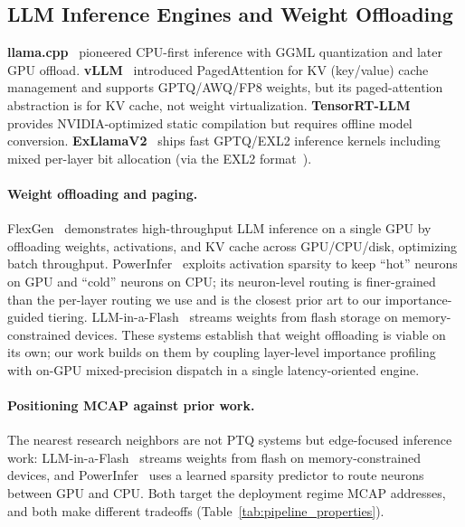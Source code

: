 \documentclass{article}
\begin{document}
\subsection{LLM Inference Engines and Weight Offloading}

\textbf{llama.cpp}~\cite{ggerganov2023llamacpp} pioneered CPU-first inference with GGML
quantization and later GPU offload. \textbf{vLLM}~\cite{kwon2023efficient} introduced
PagedAttention for KV (key/value) cache management and supports GPTQ/AWQ/FP8 weights, but its
paged-attention abstraction is for KV cache, not weight virtualization.
\textbf{TensorRT-LLM}~\cite{nvidia2023tensorrt} provides NVIDIA-optimized static
compilation but requires offline model conversion. \textbf{ExLlamaV2}~\cite{turboderp2023exllama}
ships fast GPTQ/EXL2 inference kernels including mixed per-layer bit allocation (via the
EXL2 format~\cite{turboderp2024exl2}).

\paragraph{Weight offloading and paging.} FlexGen~\cite{sheng2023flexgen}
demonstrates high-throughput LLM inference on a single GPU by offloading
weights, activations, and KV cache across GPU/CPU/disk, optimizing batch
throughput. PowerInfer~\cite{song2024powerinfer} exploits activation
sparsity to keep ``hot'' neurons on GPU and ``cold'' neurons on CPU; its
neuron-level routing is finer-grained than the per-layer routing we use and
is the closest prior art to our importance-guided tiering.
LLM-in-a-Flash~\cite{alizadeh2024llmflash} streams weights from flash
storage on memory-constrained devices. These systems establish that
weight offloading is viable on its own; our work builds on them by coupling
layer-level importance profiling with on-GPU mixed-precision dispatch in a
single latency-oriented engine.

\paragraph{Positioning MCAP against prior work.} The nearest research neighbors are
not PTQ systems but edge-focused inference work: LLM-in-a-Flash~\cite{alizadeh2024llmflash}
streams weights from flash on memory-constrained devices, and
PowerInfer~\cite{song2024powerinfer} uses a learned sparsity predictor to route neurons
between GPU and CPU. Both target the deployment regime MCAP addresses, and both make
different tradeoffs (Table~\ref{tab:pipeline_properties}).
\end{document}
